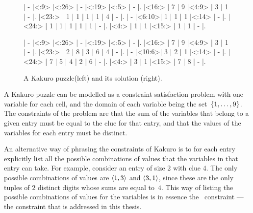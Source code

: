 \documentclass[a4paper,11pt]{article}
\theoremstyle{definition}
\newcommand{\Table}{\Constraint{Table}}
\numberwithin{equation}{section}
\begin{document}
\begin{figure}
  \centering
  \begin{minipage}{.45\textwidth}

    \begin{Kakuro}{6}{6}
      |  -   |<:9>  |<:26> |  -   |<:19> |<:5>  |  -   |.
      |<16:> |  7   |  9   |<4:9> |  3   |  1   |  -   |.
      |<23:> |  1   |  1   |  1   |  1   |  4   |  -   |.
      |  -   |<6:10>|  1   |  1   |  1   |<:14> |  -   |.
      |<24:> |  1   |  1   |  1   |  1   |  1   |  -   |.
      |<4:>  |  1   |  1   |<15:> |  1   |  1   |  -   |.
    \end{Kakuro}
  \end{minipage}
  \begin{minipage}{.45\textwidth}
    \PuzzleSolution
    \begin{Kakuro}{6}{6}
      |  -   |<:9>  |<:26> |  -   |<:19> |<:5>  |  -   |.
      |<16:> |  7   |  9   |<4:9> |  3   |  1   |  -   |.
      |<23:> |  2   |  8   |  3   |  6   |  4   |  -   |.
      |  -   |<10:6>|  3   |  2   |  1   |<:14> |  -   |.
      |<24:> |  7   |  5   |  4   |  2   |  6   |  -   |.
      |<4:>  |  3   |  1   |<15:> |  7   |  8   |  -   |.
    \end{Kakuro}
  \end{minipage}
  \caption{A Kakuro puzzle\protect\footnotemark (left) and its solution (right).}
  \label{fig:kakuro}
\end{figure}


A Kakuro puzzle can be modelled as a constraint satisfaction problem with one variable
for each cell, and the domain of each variable being the set~$\left\{1,\ldots,9\right\}$.
The constraints of the problem are that the sum of the variables that
belong to a given entry must be equal to the clue for that entry, and that the
values of the variables for each entry must be distinct.

An alternative way of phrasing the constraints of Kakuro is to for each entry
explicitly list all the possible combinations
of values that the variables in that entry can take.
For example, consider an entry of size 2 with clue 4. The only
possible combinations of values are $\left\langle1,3\right\rangle$ and $\left\langle3,1\right\rangle$, since
these are the only tuples of $2$ distinct digits whose sums are
equal to~$4$. This way of listing the possible combinations of
values for the variables is in essence the
\Table~constraint --- the constraint that is
addressed in this thesis.
\end{document}
